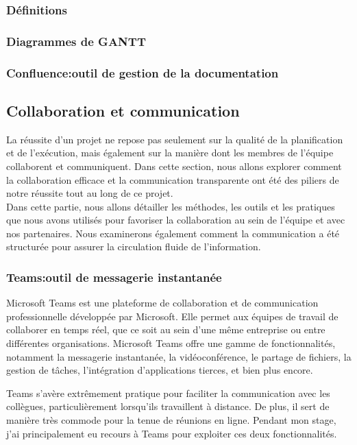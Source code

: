 \documentclass[a4paper, 12pt, french]{article}
\begin{document}
				\subsubsection{Définitions}
				\subsubsection{Diagrammes de GANTT}
				\subsubsection{Confluence:outil de gestion de la documentation}
				
			\subsection{Collaboration et communication}
				La réussite d'un projet ne repose pas seulement sur la qualité de la planification et de l'exécution, mais également sur la manière dont les membres de l'équipe collaborent et communiquent. Dans cette section, nous allons explorer comment la collaboration efficace et la communication transparente ont été des piliers de notre réussite tout au long de ce projet.\\

				Dans cette partie, nous allons détailler les méthodes, les outils et les pratiques que nous avons utilisés pour favoriser la collaboration au sein de l'équipe et avec nos partenaires. Nous examinerons également comment la communication a été structurée pour assurer la circulation fluide de l'information.

				\subsubsection{Teams:outil de messagerie instantanée}%
					Microsoft Teams est une plateforme de collaboration et de communication professionnelle développée par Microsoft. Elle permet aux équipes de travail de collaborer en temps réel, que ce soit au sein d'une même entreprise ou entre différentes organisations. Microsoft Teams offre une gamme de fonctionnalités, notamment la messagerie instantanée, la vidéoconférence, le partage de fichiers, la gestion de tâches, l'intégration d'applications tierces, et bien plus encore.
					
					Teams s'avère extrêmement pratique pour faciliter la communication avec les collègues, particulièrement lorsqu'ils travaillent à distance. De plus, il sert de manière très commode pour la tenue de réunions en ligne. Pendant mon stage, j'ai principalement eu recours à Teams pour exploiter ces deux fonctionnalités.
\end{document}
